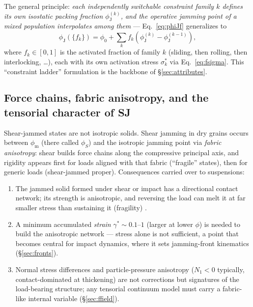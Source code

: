 \documentclass[11pt]{article}
\newcommand{\phiJ}{\phi_{\mathrm{J}}}
\newcommand{\phiO}{\phi_{0}}
\newcommand{\phiM}{\phi_{\mathrm{m}}}
\newcommand{\sigmastar}{\sigma^{*}}
\begin{document}
The general principle: \emph{each independently switchable constraint family $k$ defines its own isostatic packing fraction $\phiJ^{(k)}$, and the operative jamming point of a mixed population interpolates among them} --- Eq.~\eqref{eq:phiJf} generalizes to
\begin{equation}
\phiJ(\{f_k\}) = \phiO + \sum_k f_k\left(\phiJ^{(k)} - \phiJ^{(k-1)}\right),
\label{eq:ladder}
\end{equation}
where $f_k \in [0,1]$ is the activated fraction of family $k$ (sliding, then rolling, then interlocking, \ldots), each with its own activation stress $\sigmastar_k$ via Eq.~\eqref{eq:fsigma}. This ``constraint ladder'' formulation \cite{guy2018} is the backbone of \S\ref{sec:attributes}.

\subsection{Force chains, fabric anisotropy, and the tensorial character of SJ}
\label{sec:fabric}
Shear-jammed states are not isotropic solids. Shear jamming in dry grains \cite{bi2011} occurs between $\phiM$ (there called $\phi_S$) and the isotropic jamming point via \emph{fabric anisotropy}: shear builds force chains along the compressive principal axis, and rigidity appears first for loads aligned with that fabric (``fragile'' states), then for generic loads (shear-jammed proper). Consequences carried over to suspensions:
\begin{enumerate}
\item The jammed solid formed under shear or impact has a directional contact network; its strength is anisotropic, and reversing the load can melt it at far smaller stress than sustaining it (fragility) \cite{cates1998fragile}.
\item A minimum accumulated \emph{strain} $\gamma^{*} \sim 0.1$--$1$ (larger at lower $\phi$) is needed to build the anisotropic network --- stress alone is not sufficient, a point that becomes central for impact dynamics, where it sets jamming-front kinematics (\S\ref{sec:fronts}).
\item Normal stress differences and particle-pressure anisotropy ($N_1<0$ typically, contact-dominated at thickening) are not corrections but signatures of the load-bearing structure; any tensorial continuum model must carry a fabric-like internal variable (\S\ref{sec:ffield}).
\end{enumerate}
\end{document}
